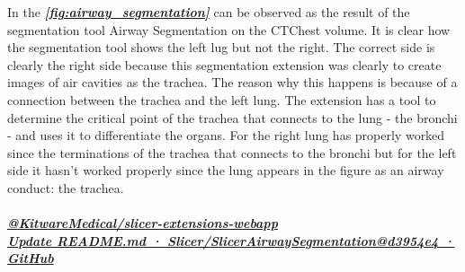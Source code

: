In the \textbf{\textit{\cref{fig:airway_segmentation}}} can be observed as the result of the 
segmentation tool Airway Segmentation on the CTChest volume. It is clear how the 
segmentation tool shows the left lug but not the right. The correct side is clearly 
the right side because this segmentation extension was clearly to create images of 
air cavities as the trachea. The reason why this happens is because of a connection 
between the trachea and the left lung. The extension has a tool to determine the 
critical point of the trachea that connects to the lung - the bronchi - and uses 
it to differentiate the organs. For the right lung has properly worked since the 
terminations of the trachea that connects to the bronchi but for the left side it 
hasn’t worked properly since the lung appears in the figure as an airway conduct: 
the trachea. \\\\
\textit{\textbf{\href{https://extensions.slicer.org/view/AirwaySegmentation/30822/win}{@KitwareMedical/slicer-extensions-webapp}}} \\
\textit{\textbf{\href{https://github.com/Slicer/SlicerAirwaySegmentation/commit/d3954e4}{Update README.md · Slicer/SlicerAirwaySegmentation@d3954e4 · GitHub}}}


